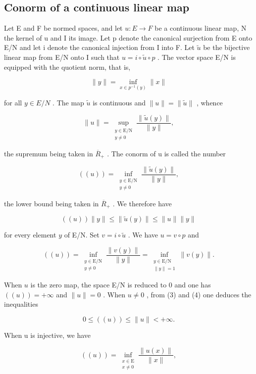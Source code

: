 \subsection{Conorm of a continuous linear map}

Let E and F be normed spaces, and let \(u: E \rightarrow F\) be a continuous linear map, N the kernel of u and I its image. Let p denote the canonical surjection from E onto E/N and let i denote the canonical injection from I into F. Let \(\widetilde{u}\) be the bijective linear map from E/N onto I such that \(u = i \circ \widetilde{u} \circ p\) . The vector space E/N is equipped with the quotient norm, that is,

\[
\| y \| = \inf _ {x \in p^{-1}(y)} \| x \|\tag{2}
\]

for all \(y \in E/N\) . The map \(\widetilde{u}\) is continuous and \(\|u\| = \|\widetilde{u}\|\) , whence

\[
\| u\| = \sup_{\substack{y\in \mathrm{E / N}\\ y\neq 0}}\frac{\|\widetilde{u} (y)\|}{\|y\|},\tag{3}
\]

the supremum being taken in \(\overline{R}_{+}\) . The conorm of u is called the number

\[
((u)) = \inf_{\substack{y\in \mathrm{E} / \mathrm{N}\\ y\neq 0}}\frac{\| \widetilde{u}(y)\|}{\|y\|},\tag{4}
\]

the lower bound being taken in \(\overline{R}_{+}\) . We therefore have

\[
((u)) \| y \| \leqslant \| \widetilde {u} (y) \| \leqslant \| u \| \| y \|\tag{5}
\]

for every element \(y\) of E/N. Set \(v = i \circ \widetilde{u}\) . We have \(u = v \circ p\) and

\[
((u)) = \inf_{\substack{y\in \mathrm{E / N}\\ y\neq 0}}\frac{\|v(y)\|}{\|y\|} = \inf_{\substack{y\in \mathrm{E / N}\\ \|y\| = 1}}\| v(y)\| .\tag{6}
\]

When \(u\) is the zero map, the space E/N is reduced to 0 and one has \(((u)) = +\infty\) and \(\| u \| = 0\) . When \(u \neq 0\) , from (3) and (4) one deduces the inequalities

\[
0 \leqslant ((u)) \leqslant \| u \| <   + \infty .\tag{7}
\]

When u is injective, we have

\[
((u)) = \inf_{\substack{x\in \mathrm{E}\\ x\neq 0}}\frac{\|u(x)\|}{\|x\|},\tag{8}
\]

